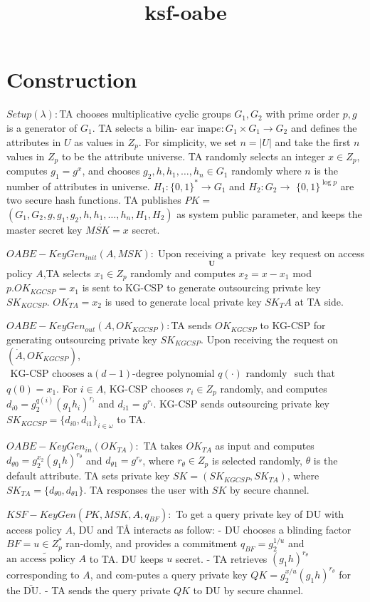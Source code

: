 \documentclass[runningheads]{llncs}
\begin{document}
\title{ksf-oabe}

\section{Construction}
$Setup(\lambda){:}$TA chooses multiplicative cyclic groups $G_1,G_2$ with prime order $p,g$ is a generator of $G_1.$ TA selects a bilin- $\bar{\text{ear map}}e:G_{1}\times G_{1}\to G_{2}$ and defines the attributes in $U$ as values in $Z_p.$ For simplicity, we set $n=|U|$ and take the first $n$ values in $Z_p$ to be the attribute universe. TA randomly selects an integer $x\in Z_p$, computes $g_1=g^x$, and chooses $g_2,h,h_1,\ldots,h_n\in G_1$ randomly where $n$ is the number of attributes in universe. $H_1:\{0,1\}^*\to G_1$ and $H_2:G_2\to$ $\{0,1\}^{\log p}$ are two secure hash functions. TA publishes $PK=$ $( G_1, G_2, g, g_1, g_2, h, h_1, \ldots , h_n, H_1, H_2)$ as system public parameter, and keeps the master secret key $M\dot{SK}=x$ secret.

$OABE-KeyGen_{init}(A,MSK){:}\underset{{\mathbf{U}}}{\operatorname*{\text{Upon receiving a private}}}$ key request on access policy $A$,TA selects $x_1\in Z_p$ randomly and computes $x_2=x-x_1$ mod $p.OK_{KGCSP}=x_1$ is sent to KG-CSP to generate outsourcing private key $SK_{KGCSP}.$ $OK_{TA}=x_2$ is used to generate local private key $SK_TA$ at TA side.

$OABE-KeyGen_{out}(A,OK_{KGCSP}){:}$TA sends $OK_{KGCSP}$ to KG-CSP for generating outsourcing private key $SK_{KGCSP}.$ Upon receiving the request on $(\dot{A},OK_{KGCSP})$, $\begin{aligned}\text{KG-CSP chooses a}\left(d-1\right)\text{-degree polynomial }q(\cdot)\text{ randomly}\end{aligned}$ such that $q(0)=x_1.$ For $i\in A$, KG-CSP chooses $r_i\in Z_p$ randomly, and computes $d_{i0}= g_2^{q( i) }( g_1h_i) ^{r_i}$ and $d_{i1}= g^{r_i}.$ KG-CSP sends outsourcing private key $SK_{KGCSP}=\{d_{i0},d_{i1}\}_{i\in\omega}$ to TA.

$OABE-KeyGen_{in}(OK_{TA}){:}$ TA takes $OK_{TA}$ as input and computes $d_{\theta0}=g_2^{x_2}(g_1h)^{r_\theta}$ and $d_{\theta1}=g^{r_\theta}$, where $r_\theta\in Z_p$ is selected randomly, $\theta$ is the default attribute. TA sets private key $SK=(SK_{KGCSP},SK_{TA})$, where $SK_{TA}=\{d_{\theta0},d_{\theta1}\}$. TA responses the user with $SK$ by secure channel.

$KSF-KeyGen(PK,MSK,A,q_{BF}){:}$ To get a query private key of DU with access policy $A$, DU and TÅ interacts as follow:
- DU chooses a blinding factor $BF=u\in Z_p^*$ ran-domly,  and provides a commitment $q_{BF}= g_2^{1/ u}$ and$\tilde{\text{an access policy }A}$ to TA. DU keeps $u$ secret.
- TA retrieves $(g_1h)^{r_\theta}$ corresponding to $A$, and com-putes a query private key $QK=g_2^{x/u}(g_1h)^{r_\theta}$ for the $\bar{\text{DU}}.$
- TA sends the query private $QK$ to DU by secure channel.
\end{document}
